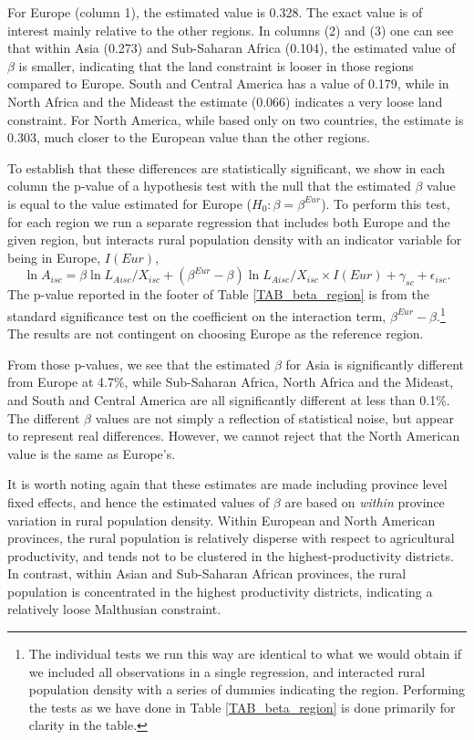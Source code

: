 \documentclass[11pt]{article}
\begin{document}
For Europe (column 1), the estimated value is 0.328. The exact value is of interest mainly relative to the other regions. In columns (2) and (3) one can see that within Asia (0.273) and Sub-Saharan Africa (0.104), the estimated value of $\beta$ is smaller, indicating that the land constraint is looser in those regions compared to Europe. South and Central America has a value of 0.179, while in North Africa and the Mideast the estimate (0.066) indicates a very loose land constraint. For North America, while based only on two countries, the estimate is 0.303, much closer to the European value than the other regions.

To establish that these differences are statistically significant, we show in each column the p-value of a hypothesis test with the null that the estimated $\beta$ value is equal to the value estimated for Europe ($H_0: \beta = \beta^{Eur}$). To perform this test, for each region we run a separate regression that includes both Europe and the given region, but interacts rural population density with an indicator variable for being in Europe, $I(Eur)$,
\begin{equation}
    \ln A_{isc} = \beta \ln L_{Aisc}/X_{isc} + (\beta^{Eur} - \beta) \ln L_{Aisc}/X_{isc} \times I(Eur) + \gamma_{sc} + \epsilon_{isc}. \label{EQ_interaction}
\end{equation}
The p-value reported in the footer of Table \ref{TAB_beta_region} is from the standard significance test on the coefficient on the interaction term, $\beta^{Eur} - \beta$.\footnote{The individual tests we run this way are identical to what we would obtain if we included all observations in a single regression, and interacted rural population density with a series of dummies indicating the region. Performing the tests as we have done in Table \ref{TAB_beta_region} is done primarily for clarity in the table.} The results are not contingent on choosing Europe as the reference region.

From those p-values, we see that the estimated $\beta$ for Asia is significantly different from Europe at 4.7\%, while Sub-Saharan Africa, North Africa and the Mideast, and South and Central America are all significantly different at less than 0.1\%. The different $\beta$ values are not simply a reflection of statistical noise, but appear to represent real differences. However, we cannot reject that the North American value is the same as Europe's.

It is worth noting again that these estimates are made including province level fixed effects, and hence the estimated values of $\beta$ are based on \textit{within} province variation in rural population density. Within European and North American provinces, the rural population is relatively disperse with respect to agricultural productivity, and tends not to be clustered in the highest-productivity districts. In contrast, within Asian and Sub-Saharan African provinces, the rural population is concentrated in the highest productivity districts, indicating a relatively loose Malthusian constraint.
\end{document}
